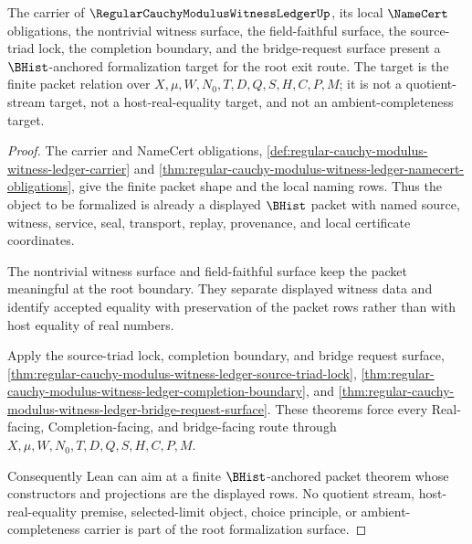 \begin{theorem}
\label{thm:regular-cauchy-modulus-witness-ledger-root-formalization-readiness}
The carrier of $\RegularCauchyModulusWitnessLedgerUp$, its local $\NameCert$ obligations, the nontrivial witness surface, the field-faithful surface, the source-triad lock, the completion boundary, and the bridge-request surface present a $\BHist$-anchored formalization target for the root exit route. The target is the finite packet relation over $X,\mu,W,N_0,T,D,Q,S,H,C,P,M$; it is not a quotient-stream target, not a host-real-equality target, and not an ambient-completeness target.
\end{theorem}
\begin{proof}
The carrier and NameCert obligations, \autoref{def:regular-cauchy-modulus-witness-ledger-carrier} and \autoref{thm:regular-cauchy-modulus-witness-ledger-namecert-obligations}, give the finite packet shape and the local naming rows. Thus the object to be formalized is already a displayed $\BHist$ packet with named source, witness, service, seal, transport, replay, provenance, and local certificate coordinates.

The nontrivial witness surface and field-faithful surface keep the packet meaningful at the root boundary. They separate displayed witness data and identify accepted equality with preservation of the packet rows rather than with host equality of real numbers.

Apply the source-triad lock, completion boundary, and bridge request surface, \autoref{thm:regular-cauchy-modulus-witness-ledger-source-triad-lock}, \autoref{thm:regular-cauchy-modulus-witness-ledger-completion-boundary}, and \autoref{thm:regular-cauchy-modulus-witness-ledger-bridge-request-surface}. These theorems force every Real-facing, Completion-facing, and bridge-facing route through $X,\mu,W,N_0,T,D,Q,S,H,C,P,M$.

Consequently Lean can aim at a finite $\BHist$-anchored packet theorem whose constructors and projections are the displayed rows. No quotient stream, host-real-equality premise, selected-limit object, choice principle, or ambient-completeness carrier is part of the root formalization surface.
\end{proof}

